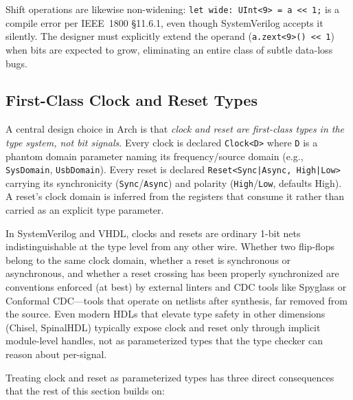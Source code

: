 \documentclass[11pt,twocolumn]{article}
\begin{document}
Shift operations are likewise non-widening: \texttt{let wide: UInt<9> = a << 1;} is a compile error per IEEE~1800 §11.6.1, even though SystemVerilog accepts it silently. The designer must explicitly extend the operand (\texttt{a.zext<9>() << 1}) when bits are expected to grow, eliminating an entire class of subtle data-loss bugs.

\subsection{First-Class Clock and Reset Types}
\label{sec:clockreset}

A central design choice in Arch is that \emph{clock and reset are first-class types in the type system, not bit signals}. Every clock is declared \texttt{Clock<D>} where \texttt{D} is a phantom domain parameter naming its frequency/source domain (e.g., \texttt{SysDomain}, \texttt{UsbDomain}). Every reset is declared \texttt{Reset<Sync|Async, High|Low>} carrying its synchronicity (\texttt{Sync}/\texttt{Async}) and polarity (\texttt{High}/\texttt{Low}, defaults High). A reset's clock domain is inferred from the registers that consume it rather than carried as an explicit type parameter.

In SystemVerilog and VHDL, clocks and resets are ordinary 1-bit nets indistinguishable at the type level from any other wire. Whether two flip-flops belong to the same clock domain, whether a reset is synchronous or asynchronous, and whether a reset crossing has been properly synchronized are conventions enforced (at best) by external linters and CDC tools like Spyglass or Conformal CDC---tools that operate on netlists after synthesis, far removed from the source. Even modern HDLs that elevate type safety in other dimensions (Chisel, SpinalHDL) typically expose clock and reset only through implicit module-level handles, not as parameterized types that the type checker can reason about per-signal.

Treating clock and reset as parameterized types has three direct consequences that the rest of this section builds on:
\end{document}
